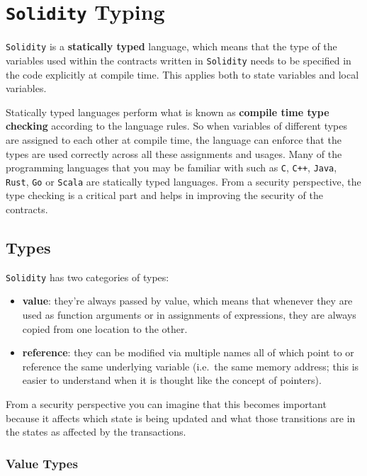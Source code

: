 \section{\texorpdfstring{\texttt{Solidity}
Typing}{Solidity Typing}}\label{solidity-typing}

\texttt{Solidity} is a \textbf{statically typed} language, which means
that the type of the variables used within the contracts written in
\texttt{Solidity} needs to be specified in the code explicitly at
compile time. This applies both to state variables and local variables.

Statically typed languages perform what is known as \textbf{compile time
type checking} according to the language rules. So when variables of
different types are assigned to each other at compile time, the language
can enforce that the types are used correctly across all these
assignments and usages. Many of the programming languages that you may
be familiar with such as \texttt{C}, \texttt{C++}, \texttt{Java},
\texttt{Rust}, \texttt{Go} or \texttt{Scala} are statically typed
languages. From a security perspective, the type checking is a critical
part and helps in improving the security of the contracts.

\subsection{Types}\label{types}

\texttt{Solidity} has two categories of types:

\begin{itemize}
\tightlist
\item
  \textbf{value}: they're always passed by value, which means that
  whenever they are used as function arguments or in assignments of
  expressions, they are always copied from one location to the other.
\item
  \textbf{reference}: they can be modified via multiple names all of
  which point to or reference the same underlying variable (i.e.~the
  same memory address; this is easier to understand when it is thought
  like the concept of pointers).
\end{itemize}

From a security perspective you can imagine that this becomes important
because it affects which state is being updated and what those
transitions are in the states as affected by the transactions.

\subsubsection{Value Types}\label{value-types}

